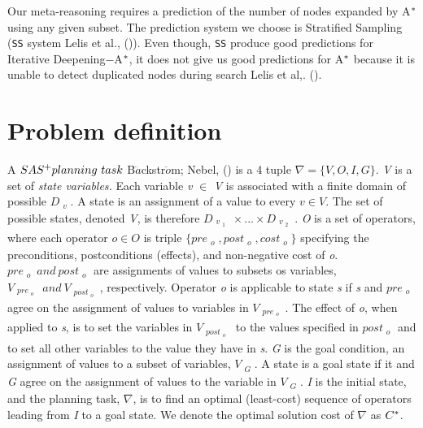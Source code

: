 Our meta-reasoning requires a prediction of the number of nodes expanded by A$\sp{*}$ using any given subset. The prediction system we choose is Stratified Sampling (\texttt{SS} system Lelis et al., (\citeyear{lelis2013predicting})). Even though, \texttt{SS} produce good predictions for Iterative Deepening$-$A$\sp{*}$, it does not give us good predictions for A$\sp{*}$ because it is unable to detect duplicated nodes during search Lelis et al,. (\citeyear{lelis2014estimating}).

\section{Problem definition}

A $SAS\sp{+} planning\ task$ B$\ddot{a}$ckstr$\ddot{o}$m; Nebel, (\citeyear{backstrom1995complexity}) is a 4 tuple $\nabla = \{V, O, I, G\}.$ \textit{V} is a set of \textit{state variables.} Each variable \textit{v} $\in$ \textit{V} is associated with a finite domain of possible $D_{\substack{v}}$. A state is an assignment of a value to every $v \in V.$ The set of possible states, denoted \textit{V}, is therefore $D_{\substack{v_{\substack{1}}}}    \times ... \times D_{\substack{v_{\substack{2}}}}$. \textit{O} is a set of operators, where each operator $o \in O$ is triple $\{pre_{\substack{o}} , post_{\substack{o}}, cost_{\substack{o}}\}$ specifying the preconditions, postconditions (effects), and non-negative cost of \textit{o}. $pre_{\substack{o}}\ and\ post_{\substack{o}}$ are assignments of values to subsets os variables, $V_{\substack{pre_{\substack{o}}}}\ and\ V_{\substack{post_{\substack{o}}}}$, respectively. Operator \textit{o} is applicable to state \textit{s} if \textit{s} and $pre_{\substack{o}}$ agree on the assignment of values to variables in $V_{\substack{pre_{\substack{o}}}}$. The effect of \textit{o}, when applied to \textit{s}, is to set the variables in $V_{\substack{post_{\substack{o}}}}$ to the values specified in $post_{\substack{o}}$ and to set all other variables to the value they have in \textit{s}. \textit{G} is the goal condition, an assignment of values to a subset of variables, $V_{\substack{G}}$. A state is a goal state if it and \textit{G} agree on the assignment of values to the variable in $V_{\substack{G}}$. \textit{I} is the initial state, and the planning task, $\nabla$, is to find an optimal (least-cost) sequence of operators leading from \textit{I} to a goal state. We denote the optimal solution cost of $\nabla$ as $C\sp{*}$. 

